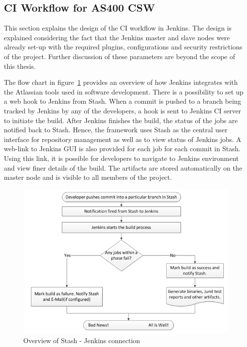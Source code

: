 \documentclass[12pt, a4paper, titlepage]{scrartcl}
\begin{document}
\subsection{CI Workflow for AS400 CSW}
\par This section explains the design of the CI workflow in Jenkins. The design is explained considering the fact that the Jenkins master and slave nodes were already set-up with the required plugins, configurations and security restrictions of the project. Further discussion of these parameters are beyond the scope of this thesis.
\par The flow chart in figure~\ref{fig:stash-jenkins-workflow} provides an overview of how Jenkins integrates with the Atlassian tools used in software development. There is a possibility to set up  a web hook to Jenkins from Stash. When a commit is pushed to a branch being tracked by Jenkins by any of the developers, a hook is sent to Jenkins CI server to initiate the build. After Jenkins finishes the build, the status of the jobs are notified back to Stash. Hence, the framework uses Stash as the central user interface for repository management as well as to view status of Jenkins jobs. A web-link to Jenkins GUI is also provided for each job for each commit in Stash. Using this link, it is possible for developers to navigate to Jenkins environment and view finer details of the build. The artifacts are stored automatically on the master node and is visible to all members of the project.
\begin{figure}[!ht]
\centering
\includegraphics[width=\textwidth]{jenkins-workflow.png}
\caption{Overview of Stash - Jenkins connection}
\label{fig:stash-jenkins-workflow}
\end{figure}
\end{document}
